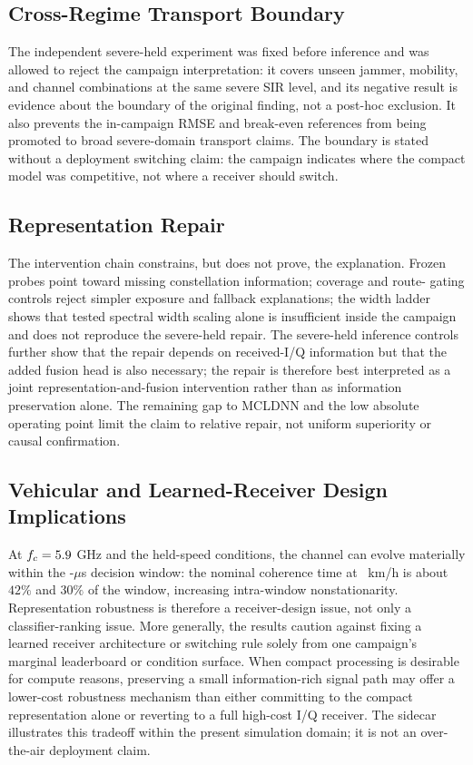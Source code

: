 \documentclass[letterpaper,journal]{IEEEtran}
\begin{document}
\subsection{Cross-Regime Transport Boundary}
The independent severe-held experiment was fixed before inference and was
allowed to reject the campaign interpretation: it covers unseen jammer,
mobility, and channel combinations at the same severe SIR level, and its
negative result is evidence about the boundary of the original finding, not a
post-hoc exclusion. It also prevents the in-campaign RMSE and break-even
references from being promoted to broad severe-domain transport claims. The
boundary is stated without a deployment switching claim: the campaign
indicates where the compact model was competitive, not where a receiver
should switch.

\subsection{Representation Repair}
The intervention chain constrains, but does not prove, the explanation. Frozen
probes point toward missing constellation information; coverage and route-
gating controls reject simpler exposure and fallback explanations; the width
ladder shows that tested spectral width scaling alone is insufficient inside
the campaign and does not reproduce the severe-held repair. The severe-held
inference controls further show that the repair depends on received-I/Q
information but that the added fusion head is also necessary; the repair is
therefore best interpreted as a joint representation-and-fusion intervention
rather than as information preservation alone. The remaining gap to MCLDNN
and the low absolute operating point limit the claim to relative repair, not
uniform superiority or causal confirmation.

\subsection{Vehicular and Learned-Receiver Design Implications}
At $f_c=5.9$ GHz and the held-speed conditions, the channel can evolve
materially within the \WindowMicroseconds-$\mu$s decision window: the nominal
coherence time at \HeldSpeeds\ km/h is about $42\%$ and $30\%$ of the window,
increasing intra-window nonstationarity. Representation robustness is
therefore a receiver-design issue, not only a classifier-ranking issue. More
generally, the results caution against fixing a learned receiver architecture
or switching rule solely from one campaign's marginal leaderboard or condition
surface. When compact processing is desirable for compute reasons, preserving
a small information-rich signal path may offer a lower-cost robustness
mechanism than either committing to the compact representation alone or
reverting to a full high-cost I/Q receiver. The sidecar illustrates this
tradeoff within the present simulation domain; it is not an over-the-air
deployment claim.
\end{document}

